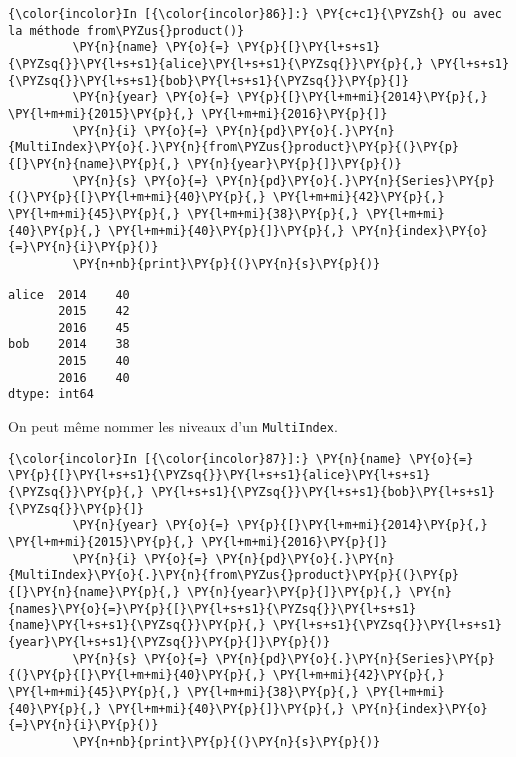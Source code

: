     \begin{Verbatim}[commandchars=\\\{\}]
{\color{incolor}In [{\color{incolor}86}]:} \PY{c+c1}{\PYZsh{} ou avec la méthode from\PYZus{}product()}
         \PY{n}{name} \PY{o}{=} \PY{p}{[}\PY{l+s+s1}{\PYZsq{}}\PY{l+s+s1}{alice}\PY{l+s+s1}{\PYZsq{}}\PY{p}{,} \PY{l+s+s1}{\PYZsq{}}\PY{l+s+s1}{bob}\PY{l+s+s1}{\PYZsq{}}\PY{p}{]}
         \PY{n}{year} \PY{o}{=} \PY{p}{[}\PY{l+m+mi}{2014}\PY{p}{,} \PY{l+m+mi}{2015}\PY{p}{,} \PY{l+m+mi}{2016}\PY{p}{]}
         \PY{n}{i} \PY{o}{=} \PY{n}{pd}\PY{o}{.}\PY{n}{MultiIndex}\PY{o}{.}\PY{n}{from\PYZus{}product}\PY{p}{(}\PY{p}{[}\PY{n}{name}\PY{p}{,} \PY{n}{year}\PY{p}{]}\PY{p}{)}
         \PY{n}{s} \PY{o}{=} \PY{n}{pd}\PY{o}{.}\PY{n}{Series}\PY{p}{(}\PY{p}{[}\PY{l+m+mi}{40}\PY{p}{,} \PY{l+m+mi}{42}\PY{p}{,} \PY{l+m+mi}{45}\PY{p}{,} \PY{l+m+mi}{38}\PY{p}{,} \PY{l+m+mi}{40}\PY{p}{,} \PY{l+m+mi}{40}\PY{p}{]}\PY{p}{,} \PY{n}{index}\PY{o}{=}\PY{n}{i}\PY{p}{)}
         \PY{n+nb}{print}\PY{p}{(}\PY{n}{s}\PY{p}{)}
\end{Verbatim}


    \begin{Verbatim}[commandchars=\\\{\}]
alice  2014    40
       2015    42
       2016    45
bob    2014    38
       2015    40
       2016    40
dtype: int64

    \end{Verbatim}

    On peut même nommer les niveaux d'un \texttt{MultiIndex}.

    \begin{Verbatim}[commandchars=\\\{\}]
{\color{incolor}In [{\color{incolor}87}]:} \PY{n}{name} \PY{o}{=} \PY{p}{[}\PY{l+s+s1}{\PYZsq{}}\PY{l+s+s1}{alice}\PY{l+s+s1}{\PYZsq{}}\PY{p}{,} \PY{l+s+s1}{\PYZsq{}}\PY{l+s+s1}{bob}\PY{l+s+s1}{\PYZsq{}}\PY{p}{]}
         \PY{n}{year} \PY{o}{=} \PY{p}{[}\PY{l+m+mi}{2014}\PY{p}{,} \PY{l+m+mi}{2015}\PY{p}{,} \PY{l+m+mi}{2016}\PY{p}{]}
         \PY{n}{i} \PY{o}{=} \PY{n}{pd}\PY{o}{.}\PY{n}{MultiIndex}\PY{o}{.}\PY{n}{from\PYZus{}product}\PY{p}{(}\PY{p}{[}\PY{n}{name}\PY{p}{,} \PY{n}{year}\PY{p}{]}\PY{p}{,} \PY{n}{names}\PY{o}{=}\PY{p}{[}\PY{l+s+s1}{\PYZsq{}}\PY{l+s+s1}{name}\PY{l+s+s1}{\PYZsq{}}\PY{p}{,} \PY{l+s+s1}{\PYZsq{}}\PY{l+s+s1}{year}\PY{l+s+s1}{\PYZsq{}}\PY{p}{]}\PY{p}{)}
         \PY{n}{s} \PY{o}{=} \PY{n}{pd}\PY{o}{.}\PY{n}{Series}\PY{p}{(}\PY{p}{[}\PY{l+m+mi}{40}\PY{p}{,} \PY{l+m+mi}{42}\PY{p}{,} \PY{l+m+mi}{45}\PY{p}{,} \PY{l+m+mi}{38}\PY{p}{,} \PY{l+m+mi}{40}\PY{p}{,} \PY{l+m+mi}{40}\PY{p}{]}\PY{p}{,} \PY{n}{index}\PY{o}{=}\PY{n}{i}\PY{p}{)}
         \PY{n+nb}{print}\PY{p}{(}\PY{n}{s}\PY{p}{)}
\end{Verbatim}


